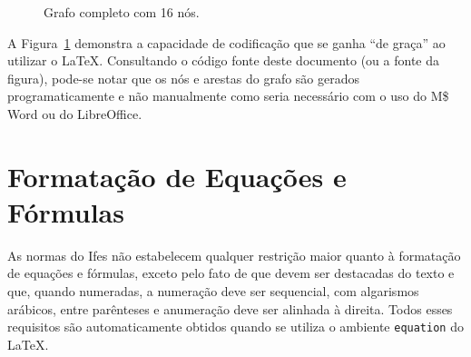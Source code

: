 \documentclass[times,english,brazilian,oneside,section=TITLE]{ifes8}
\begin{document}
\begin{figure}[h]
  \centering
  \caption{Grafo completo com 16 nós.}
  \label{fig:ex2}
  \newcount\mycount
\end{figure}

A Figura~\ref{fig:ex2} demonstra a capacidade de codificação que se
ganha ``de graça'' ao utilizar o \LaTeX. Consultando o código fonte
deste documento (ou a fonte da figura), pode-se notar que os nós e
arestas do grafo são gerados programaticamente e não manualmente como
seria necessário com o uso do M\$ Word ou do LibreOffice.


\section{Formatação de Equações e Fórmulas}
\label{sec:format-equac}

As normas do Ifes não estabelecem qualquer restrição maior quanto à
formatação de equações e fórmulas, exceto pelo fato de que devem ser
destacadas do texto e que, quando numeradas, a numeração deve ser
sequencial, com algarismos arábicos, entre parênteses e anumeração
deve ser alinhada à direita. Todos esses requisitos são
automaticamente obtidos quando se utiliza o ambiente \texttt{equation}
do \LaTeX.
\end{document}
